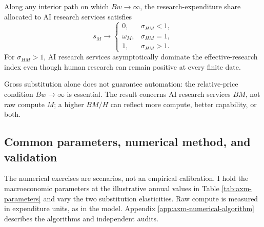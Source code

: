\begin{proposition}
\label{prop:axm-research-automation}
Along any interior path on which \(Bw\to\infty\), the research-expenditure share
allocated to AI research services satisfies
\[
 s_M\to
 \begin{cases}
  0,&\sigma_{HM}<1,\\
  \omega_M,&\sigma_{HM}=1,\\
  1,&\sigma_{HM}>1.
 \end{cases}
\]
For \(\sigma_{HM}>1\), AI research services asymptotically dominate the
effective-research index even though human research can remain positive at every
finite date.
\end{proposition}

Gross substitution alone does not guarantee automation: the relative-price
condition \(Bw\to\infty\) is essential. The result concerns AI research services
\(BM\), not raw compute \(M\); a higher \(BM/H\) can reflect more compute,
better capability, or both.

\subsection{Common parameters, numerical method, and validation}

The numerical exercises are scenarios, not an empirical calibration. I hold the
macroeconomic parameters at the illustrative annual values in Table
\ref{tab:axm-parameters} and vary the two substitution elasticities. Raw compute
is measured in expenditure units, as in the model. Appendix
\ref{app:axm-numerical-algorithm} describes the algorithms and independent
audits.

